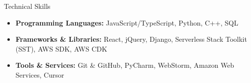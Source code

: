 \documentclass[]{mcdowellcv}
\begin{document}
	\begin{cvsection}{Technical Skills}
		\begin{cvsubsection}{}{}{}
			\begin{itemize}
				\item \textbf{Programming Languages:} JavaScript/TypeScript, Python, C++, SQL
				\item \textbf{Frameworks \& Libraries:} React, jQuery, Django, Serverless Stack Toolkit (SST), AWS SDK, AWS CDK
				\item \textbf{Tools \& Services:} Git \& GitHub, PyCharm, WebStorm, Amazon Web Services, Cursor
			\end{itemize}
		\end{cvsubsection}
	\end{cvsection}
	
\end{document}

